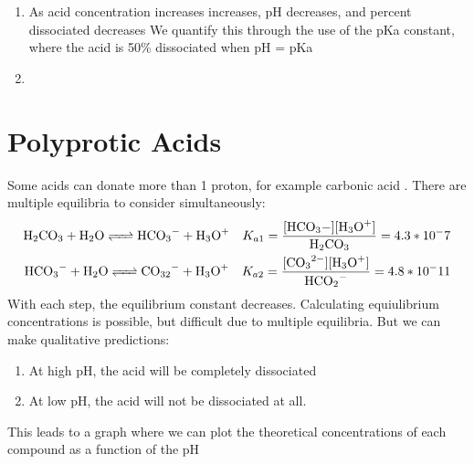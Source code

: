 \documentclass{article}  %
\begin{document}
\begin{enumerate}
    \item As acid concentration increases  increases, pH decreases, and percent dissociated decreases
    We quantify this through the use of the pKa constant, where the acid is 50\% dissociated when pH = pKa %
    \item 
\end{enumerate}

\section*{Polyprotic Acids}
Some acids can donate more than 1 proton, for example carbonic acid .
There are multiple equilibria to consider simultaneously:
\begin{equation*}
    \begin{aligned}
        \ce{H2CO3 + H2O <=> HCO3- + H3O+} \quad K_{a1} = \ce{\frac{[HCO3-][H3O+]}{H2CO3}} = 4.3*10^-7  \\
        \ce{HCO3- + H2O <=> CO32- + H3O+} \quad K_{a2} = \ce{\frac{[CO3^2-][H3O+]}{HCO2-}} = 4.8*10^-11 \\
    \end{aligned}
\end{equation*}
With each step, the equilibrium constant decreases. 
\newline 
Calculating equiulibrium concentrations is possible, but difficult due to multiple equilibria. But we can make qualitative predictions:
\begin{enumerate}
    \item At high pH, the acid will be completely dissociated
    \item At low pH, the acid will not be dissociated at all.
\end{enumerate}
This leads to a graph where we can plot the theoretical concentrations of each compound as a function of the pH
\end{document}

